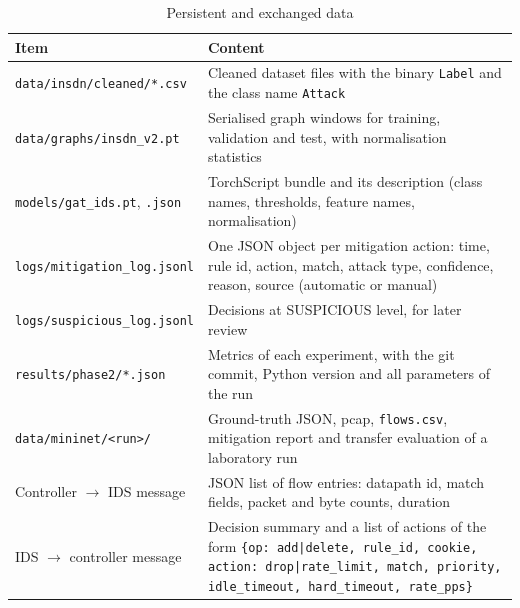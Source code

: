 \begin{table}[htbp]
\centering
\caption{Persistent and exchanged data}
\label{tab:datastores}
\small
\begin{tabularx}{\textwidth}{|p{4.2cm}|X|}
\hline
\textbf{Item} & \textbf{Content} \\ \hline
\texttt{data/insdn/cleaned/*.csv} & Cleaned dataset files with the binary \texttt{Label} and the class name \texttt{Attack} \\ \hline
\texttt{data/graphs/insdn\_v2.pt} & Serialised graph windows for training, validation and test, with normalisation statistics \\ \hline
\texttt{models/gat\_ids.pt}, \texttt{.json} & TorchScript bundle and its description (class names, thresholds, feature names, normalisation) \\ \hline
\texttt{logs/mitigation\_log.jsonl} & One JSON object per mitigation action: time, rule id, action, match, attack type, confidence, reason, source (automatic or manual) \\ \hline
\texttt{logs/suspicious\_log.jsonl} & Decisions at SUSPICIOUS level, for later review \\ \hline
\texttt{results/phase2/*.json} & Metrics of each experiment, with the git commit, Python version and all parameters of the run \\ \hline
\texttt{data/mininet/<run>/} & Ground-truth JSON, pcap, \texttt{flows.csv}, mitigation report and transfer evaluation of a laboratory run \\ \hline
Controller $\to$ IDS message & JSON list of flow entries: datapath id, match fields, packet and byte counts, duration \\ \hline
IDS $\to$ controller message & Decision summary and a list of actions of the form \texttt{\{op: add|delete, rule\_id, cookie, action: drop|rate\_limit, match, priority, idle\_timeout, hard\_timeout, rate\_pps\}} \\ \hline
\end{tabularx}
\end{table}

